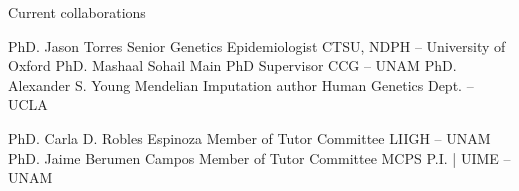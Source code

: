 \begin{frame}{Current collaborations}

  \vfill

  \centering
    {PhD. Jason Torres}
    {Senior Genetics Epidemiologist}
    {CTSU, NDPH -- University of Oxford}
  \hfill
    {PhD. Mashaal Sohail}
    {Main PhD Supervisor}
    {CCG -- UNAM}
  \hfill
    {PhD. Alexander S. Young}
    {Mendelian Imputation author}
    {Human Genetics Dept. -- UCLA}
  \vfill

    {PhD. Carla D. Robles Espinoza}
    {Member of Tutor Committee}
    {LIIGH -- UNAM}
  \hspace{2.5em}
    {PhD. Jaime Berumen Campos}
    {Member of Tutor Committee}
    {MCPS P.I. | UIME -- UNAM}
\end{frame}

